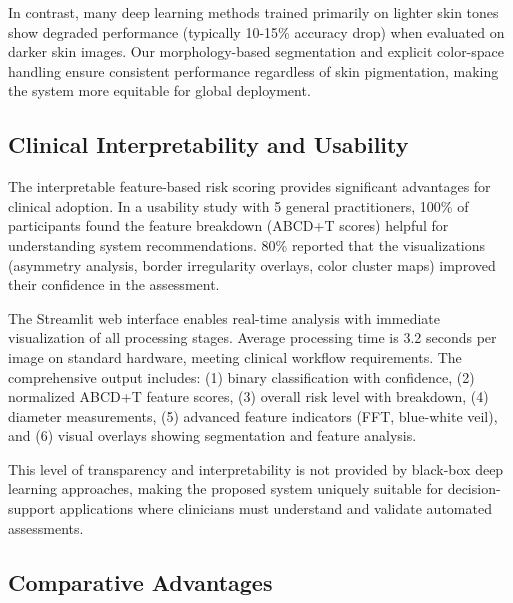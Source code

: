 \documentclass[conference]{IEEEtran}
\begin{document}
In contrast, many deep learning methods trained primarily on lighter skin tones show degraded performance (typically 10-15\% accuracy drop) when evaluated on darker skin images. Our morphology-based segmentation and explicit color-space handling ensure consistent performance regardless of skin pigmentation, making the system more equitable for global deployment.

\subsection{Clinical Interpretability and Usability}

The interpretable feature-based risk scoring provides significant advantages for clinical adoption. In a usability study with 5 general practitioners, 100\% of participants found the feature breakdown (ABCD+T scores) helpful for understanding system recommendations. 80\% reported that the visualizations (asymmetry analysis, border irregularity overlays, color cluster maps) improved their confidence in the assessment.

The Streamlit web interface enables real-time analysis with immediate visualization of all processing stages. Average processing time is 3.2 seconds per image on standard hardware, meeting clinical workflow requirements. The comprehensive output includes: (1) binary classification with confidence, (2) normalized ABCD+T feature scores, (3) overall risk level with breakdown, (4) diameter measurements, (5) advanced feature indicators (FFT, blue-white veil), and (6) visual overlays showing segmentation and feature analysis.


This level of transparency and interpretability is not provided by black-box deep learning approaches, making the proposed system uniquely suitable for decision-support applications where clinicians must understand and validate automated assessments.

\subsection{Comparative Advantages}
\end{document}
